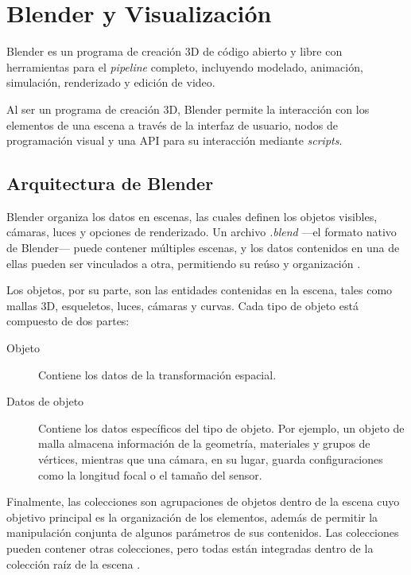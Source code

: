 \section{Blender y Visualización}
Blender es un programa de creación 3D de código abierto y libre con herramientas para el 
\textit{pipeline} completo, incluyendo modelado, animación, simulación, renderizado y edición de video.
\medskip

Al ser un programa de creación 3D, Blender permite la interacción con los elementos de una escena
a través de la interfaz de usuario, nodos de programación visual y una API para su interacción
mediante \textit{scripts}. 

\subsection{Arquitectura de Blender}
Blender organiza los datos en escenas, las cuales definen los objetos visibles, cámaras, luces y
opciones de renderizado. Un archivo \textit{.blend} ---el formato nativo de Blender--- puede contener
múltiples escenas, y los datos contenidos en una de ellas pueden ser vinculados a otra, 
permitiendo su reúso y organización \parencite{blendersceneintro}.
\medskip

Los objetos, por su parte, son las entidades contenidas en la escena, tales como mallas 3D, esqueletos,
luces, cámaras y curvas. Cada tipo de objeto está compuesto de dos partes:
\begin{description}
    \item[Objeto] Contiene los datos de la transformación espacial.
    \item[Datos de objeto] Contiene los datos específicos del tipo de objeto. Por ejemplo, un
    objeto de malla almacena información de la geometría, materiales y grupos de vértices, mientras
    que una cámara, en su lugar, guarda configuraciones como la longitud focal o el tamaño del
    sensor.
\end{description}\parencite{blenderobjectintro}
\medskip

Finalmente, las colecciones son agrupaciones de objetos dentro de la escena cuyo objetivo principal
es la organización de los elementos, además de permitir la manipulación conjunta de algunos parámetros de sus 
contenidos. Las colecciones pueden contener otras colecciones, pero todas están integradas 
dentro de la colección raíz de la escena \parencite{blendercollectionintro}.

